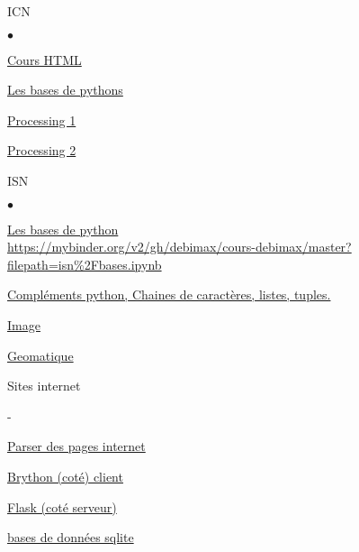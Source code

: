 \documentclass[10pt,dvipsnames,  dvips]{article}
\newcounter{Chapter}
\newcounter{Sec}[Chapter]
\begin{document}

\begin{list}{}{}
\item ICN
	\begin{list}{$\bullet$}{}
	\item \href{https://github.com/debimax/cours-debimax/raw/master/icn/cours-html.pdf}{Cours HTML}
	\item \href{https://mybinder.org/v2/gh/debimax/cours-debimax/master?filepath=seconde%2Fpython_seconde.ipynb}{Les bases de pythons}
	\item \href{https://mybinder.org/v2/gh/debimax/cours-debimax/master?filepath=icn%2FProcessing_Python_1.ipynb}{Processing 1}
	\item \href{http://htmlpreview.github.com/?https://github.com/debimax/cours-debimax/blob/master/icn/Processing_Python_2.html}{Processing 2}
	\end{list}
\item ISN
	\begin{list}{$\bullet$}{}
	\item \href{https://mybinder.org/v2/gh/debimax/cours-debimax/master?filepath=isn%2Fbases.ipynb}{Les bases de python}\\
		\url{https://mybinder.org/v2/gh/debimax/cours-debimax/master?filepath=isn%2Fbases.ipynb}
	\item \href{https://mybinder.org/v2/gh/debimax/cours-debimax/master?filepath=isn%2Fstring-listes.ipynb}{Compléments python, Chaines de caractères, listes, tuples.}
	\item \href{https://mybinder.org/v2/gh/debimax/cours-debimax/master?filepath=isn%2Fimages.ipynb}{Image}
	\item \href{https://mybinder.org/v2/gh/debimax/cours-debimax/master?filepath=isn%2FCartographie.ipynb}{Geomatique}
	\item Sites internet
		\begin{list}{-}{}
		\item \href{https://mybinder.org/v2/gh/debimax/cours-debimax/master?filepath=isn%2FParser_des_pages_internet.ipynb}{Parser des pages internet}
		\item \href{https://mybinder.org/v2/gh/debimax/cours-debimax/master?filepath=isn%2FBrython.ipynb}{Brython (coté) client}
		\item \href{https://mybinder.org/v2/gh/debimax/cours-debimax/master?filepath=isn%2Fflask.ipynb}{Flask (coté serveur)}
		\end{list}
	\item \href{https://mybinder.org/v2/gh/debimax/cours-debimax/master?filepath=isn%2FBases%20de%20donnees.ipynb}{bases de données sqlite}
	\end{list}
\end{list}
\end{document}
